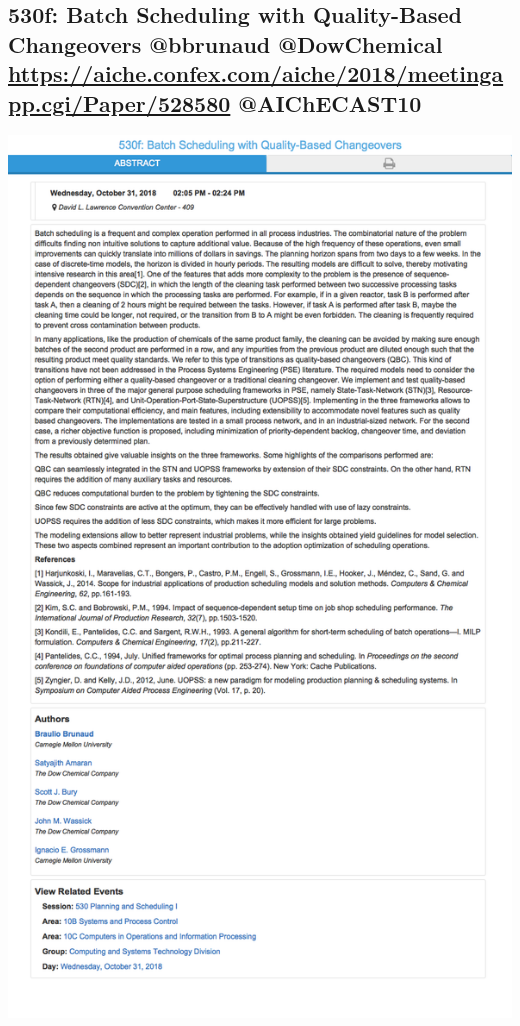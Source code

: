 \documentclass[11pt]{article}
\begin{document}
\subsection{530f: Batch Scheduling with Quality-Based Changeovers @bbrunaud @DowChemical \url{https://aiche.confex.com/aiche/2018/meetingapp.cgi/Paper/528580} @AIChECAST10}
\label{sec:orgbe7e62a}
\begin{center}
\includegraphics[width=.9\linewidth]{./528580.png}
\end{center}
\end{document}
